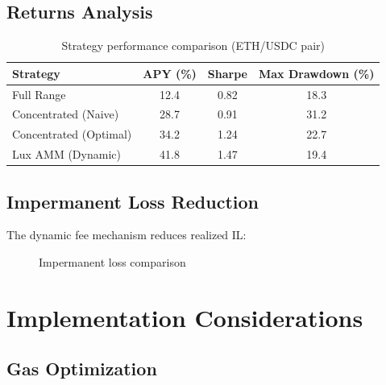 \documentclass[11pt,a4paper]{article}
\begin{document}
\subsection{Returns Analysis}

\begin{table}[h]
\centering
\begin{tabular}{@{}lccc@{}}
\toprule
Strategy & APY (\%) & Sharpe & Max Drawdown (\%) \\
\midrule
Full Range & 12.4 & 0.82 & 18.3 \\
Concentrated (Naive) & 28.7 & 0.91 & 31.2 \\
Concentrated (Optimal) & 34.2 & 1.24 & 22.7 \\
Lux AMM (Dynamic) & 41.8 & 1.47 & 19.4 \\
\bottomrule
\end{tabular}
\caption{Strategy performance comparison (ETH/USDC pair)}
\label{tab:performance}
\end{table}

\subsection{Impermanent Loss Reduction}

The dynamic fee mechanism reduces realized IL:

\begin{figure}[h]
\centering
{}
\caption{Impermanent loss comparison}
\label{fig:il_comparison}
\end{figure}

\section{Implementation Considerations}

\subsection{Gas Optimization}
\end{document}
